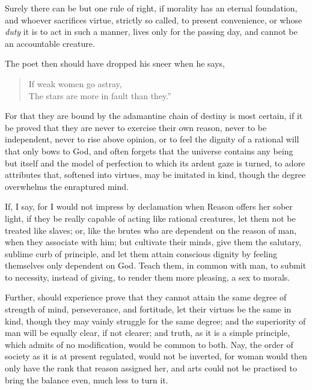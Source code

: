 Surely there can be but one rule of right, if morality has an eternal
foundation, and whoever sacrifices virtue, strictly so called, to
present convenience, or whose \textit{duty} it is to act in such a
manner, lives only for the passing day, and cannot be an accountable
creature.

The poet then should have dropped his sneer when he says,


\begin{verse}
If weak women go astray,\\
The stars are more in fault than they.''
\end{verse}

\noindent For that they are bound by the adamantine chain of destiny
is most certain, if it be proved that they are never to exercise their
own reason, never to be independent, never to rise  above
opinion, or to feel the dignity of a rational will that only bows to
God, and often forgets that the universe contains any being but itself
and the model of perfection to which its ardent gaze is turned, to
adore attributes that, softened into virtues, may be imitated in kind,
though the degree overwhelms the enraptured mind.

If, I say, for I would not impress by declamation when Reason offers
her sober light, if they be really capable of acting like rational
creatures, let them not be treated like slaves; or, like the brutes
who are dependent on the reason of man, when they associate with him;
but cultivate their minds, give them the salutary, sublime curb of
principle, and let them attain conscious dignity by feeling themselves
only dependent on God. Teach them, in common with man, to submit to
necessity, instead of giving, to render them more pleasing, a sex to
morals.

Further, should experience prove that they cannot attain the same
degree of \llb strength of mind, perseverance, and fortitude, let
their virtues be the same in kind, though they may vainly struggle for
the same degree; and the superiority of man will be equally clear, if
not  clearer; and truth, as it is a simple principle, which
admits of no modification, would be common to both. Nay, the order of
society as it is at present regulated, would not be inverted, for
woman would then only have the rank that reason assigned her, and arts
could not be practised to bring the balance even, much less to turn
it.

